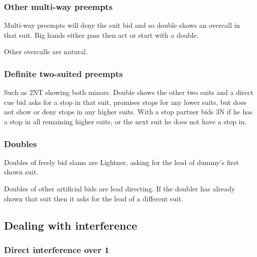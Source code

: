 \documentclass[a4paper,14pt]{extarticle}
\begin{document}
\subsubsection{Other multi-way preempts}

Multi-way preempts will deny the suit bid and so double shows an overcall in
that suit. Big hands either pass then act or start with a double.

Other overcalls are natural.

\subsubsection{Definite two-suited preempts}

Such as 2NT showing both minors. Double shows the other two suits and a direct
cue bid asks for a stop in that suit, promises stops for any lower suits, but
does not show or deny stops in any higher suits. With a stop partner bids 3N if
he has a stop in all remaining higher suits, or the next suit he does not have
a stop in.

\subsubsection{Doubles}
\label{sec:def:doubles}

Doubles of freely bid slams are Lightner, asking for the lead of dummy's first shown suit.

Doubles of other artificial bids are lead directing. If the doubler has already shown that
suit then it asks for the lead of a different suit.

\newpage

\subsection{Dealing with interference}
\label{sec:interference}

\subsubsection{Direct interference over 1\clubs}
\label{sec:intf:1c}
\end{document}
